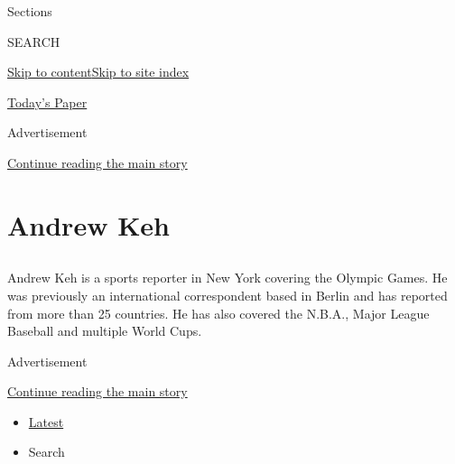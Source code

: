 Sections

SEARCH

\protect\hyperlink{site-content}{Skip to
content}\protect\hyperlink{site-index}{Skip to site index}

\href{https://myaccount.nytimes3xbfgragh.onion/auth/login?response_type=cookie\&client_id=vi}{}

\href{https://www.nytimes3xbfgragh.onion/section/todayspaper}{Today's
Paper}

Advertisement

\protect\hyperlink{after-top}{Continue reading the main story}

\hypertarget{andrew-keh}{%
\section{Andrew Keh}\label{andrew-keh}}

\subsection{}

Andrew Keh is a sports reporter in New York covering the Olympic Games.
He was previously an international correspondent based in Berlin and has
reported from more than 25 countries. He has also covered the N.B.A.,
Major League Baseball and multiple World Cups.

Advertisement

\protect\hyperlink{after-mid1}{Continue reading the main story}

\begin{itemize}
\tightlist
\item
  \protect\hyperlink{stream-panel}{Latest}
\item
  Search
\end{itemize}

